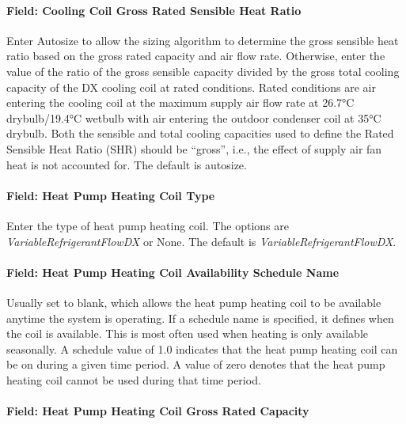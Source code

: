 \paragraph{Field: Cooling Coil Gross Rated Sensible Heat Ratio}\label{field-cooling-coil-gross-rated-sensible-heat-ratio-3}

Enter Autosize to allow the sizing algorithm to determine the gross sensible heat ratio based on the gross rated capacity and air flow rate. Otherwise, enter the value of the ratio of the gross sensible capacity divided by the gross total cooling capacity of the DX cooling coil at rated conditions. Rated conditions are air entering the cooling coil at the maximum supply air flow rate at 26.7°C drybulb/19.4°C wetbulb with air entering the outdoor condenser coil at 35°C drybulb. Both the sensible and total cooling capacities used to define the Rated Sensible Heat Ratio (SHR) should be ``gross'', i.e., the effect of supply air fan heat is not accounted for. The default is autosize.

\paragraph{Field: Heat Pump Heating Coil Type}\label{field-heat-pump-heating-coil-type-2}

Enter the type of heat pump heating coil. The options are \emph{VariableRefrigerantFlowDX} or None. The default is \emph{VariableRefrigerantFlowDX}.

\paragraph{Field: Heat Pump Heating Coil Availability Schedule Name}\label{field-heat-pump-heating-coil-availability-schedule-name-1}

Usually set to blank, which allows the heat pump heating coil to be available anytime the system is operating. If a schedule name is specified, it defines when the coil is available. This is most often used when heating is only available seasonally. A schedule value of 1.0 indicates that the heat pump heating coil can be on during a given time period. A value of zero denotes that the heat pump heating coil cannot be used during that time period.

\paragraph{Field: Heat Pump Heating Coil Gross Rated Capacity}\label{field-heat-pump-heating-coil-gross-rated-capacity-2}

